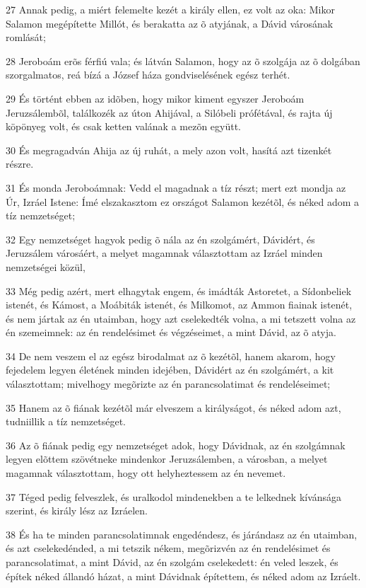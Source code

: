 \par 27 Annak pedig, a miért felemelte kezét a király ellen, ez volt az oka: Mikor Salamon megépítette Millót, és berakatta az õ atyjának, a Dávid városának romlását;
\par 28 Jeroboám erõs férfiú vala; és látván Salamon, hogy az õ szolgája az õ dolgában szorgalmatos, reá bízá a József háza gondviselésének egész terhét.
\par 29 És történt ebben az idõben, hogy mikor kiment egyszer Jeroboám Jeruzsálembõl, találkozék az úton Ahijával, a Silóbeli prófétával, és rajta új köpönyeg volt, és csak ketten valának a mezõn együtt.
\par 30 És megragadván Ahija az új ruhát, a mely azon volt, hasítá azt tizenkét részre.
\par 31 És monda Jeroboámnak: Vedd el magadnak a tíz részt; mert ezt mondja az Úr, Izráel Istene: Ímé elszakasztom ez országot Salamon kezétõl, és néked adom a tíz nemzetséget;
\par 32 Egy nemzetséget hagyok pedig õ nála az én szolgámért, Dávidért, és Jeruzsálem városáért, a melyet magamnak választottam az Izráel minden nemzetségei közül,
\par 33 Még pedig azért, mert elhagytak engem, és imádták Astoretet, a Sídonbeliek istenét, és Kámost, a Moábiták istenét, és Milkomot, az Ammon fiainak istenét, és nem jártak az én utaimban, hogy azt cselekedték volna, a mi tetszett volna az én szemeimnek: az én rendelésimet és végzéseimet, a mint Dávid, az õ atyja.
\par 34 De nem veszem el az egész birodalmat az õ kezétõl, hanem akarom, hogy fejedelem legyen életének minden idejében, Dávidért az én szolgámért, a kit választottam; mivelhogy megõrizte az én parancsolatimat és rendeléseimet;
\par 35 Hanem az õ fiának kezétõl már elveszem a királyságot, és néked adom azt, tudniillik a tíz nemzetséget.
\par 36 Az õ fiának pedig egy nemzetséget adok, hogy Dávidnak, az én szolgámnak legyen elõttem szövétneke mindenkor Jeruzsálemben, a városban, a melyet magamnak választottam, hogy ott helyheztessem az én nevemet.
\par 37 Téged pedig felveszlek, és uralkodol mindenekben a te lelkednek kívánsága szerint, és király lész az Izráelen.
\par 38 És ha te minden parancsolatimnak engedéndesz, és járándasz az én utaimban, és azt cselekedénded, a mi tetszik nékem, megõrizvén az én rendelésimet és parancsolatimat, a mint Dávid, az én szolgám cselekedett: én veled leszek, és építek néked állandó házat, a mint Dávidnak építettem, és néked adom az Izráelt.
